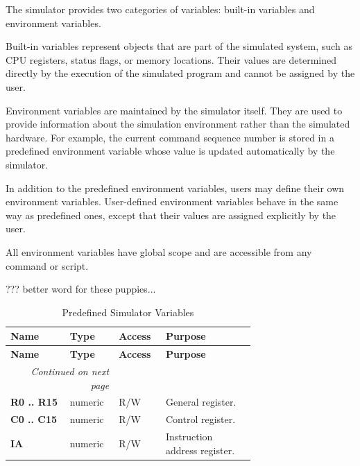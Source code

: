 
The simulator provides two categories of variables: built-in variables and environment variables.

Built-in variables represent objects that are part of the simulated system, such as CPU registers, status flags, or memory locations. Their values are determined directly by the execution of the simulated program and cannot be assigned by the user.

Environment variables are maintained by the simulator itself. They are used to provide information about the simulation environment rather than the simulated hardware. For example, the current command sequence number is stored in a predefined environment variable whose value is updated automatically by the simulator.

In addition to the predefined environment variables, users may define their own environment variables. User-defined environment variables behave in the same way as predefined ones, except that their values are assigned explicitly by the user.

All environment variables have global scope and are accessible from any command or script.



??? better word for these puppies...

\begin{longtable}{@{}p{0.2\linewidth}p{0.1\linewidth}p{0.1\linewidth}p{0.3\linewidth}@{}}
    \caption{Predefined Simulator Variables} \\
    \toprule
    \textbf{Name} & \textbf{Type } & \textbf{Access } & \textbf{Purpose} \\
    \midrule
    \endfirsthead
    \toprule
    \textbf{Name} & \textbf{Type } & \textbf{Access } & \textbf{Purpose} \\
    \midrule
    \endhead
    \midrule
    \multicolumn{2}{r}{\textit{Continued on next page}} \\
    \midrule
    \endfoot
    \bottomrule
    \endlastfoot
    \textbf{R0 .. R15} & numeric & R/W & General register. \\
    \midrule
    \textbf{C0 .. C15} & numeric & R/W & Control register. \\
    \midrule
    \textbf{IA} & numeric & R/W & Instruction address register. \\
    \midrule
\end{longtable}




